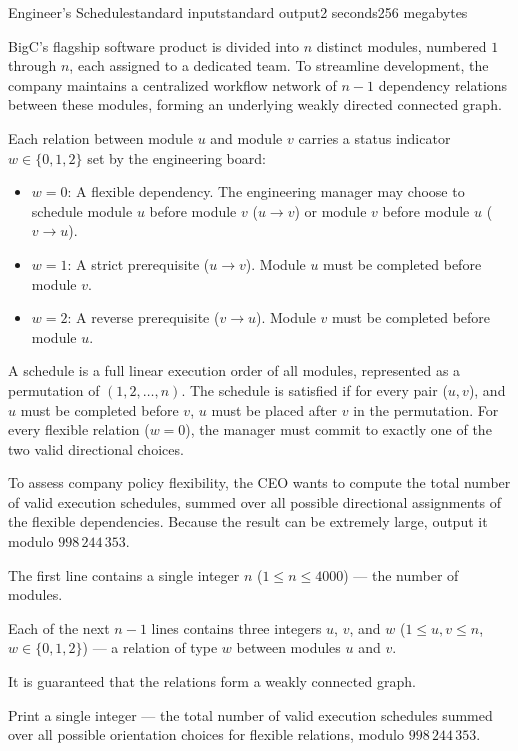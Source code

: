 \begin{problem}{Engineer's Schedule}{standard input}{standard output}{2 seconds}{256 megabytes}

BigC's flagship software product is divided into $n$ distinct modules, numbered $1$ through $n$, each assigned to a dedicated team. 
To streamline development, the company maintains a centralized workflow network of $n - 1$ dependency relations between these modules, forming an underlying weakly directed connected graph.

Each relation between module $u$ and module $v$ carries a status indicator $w \in \{0, 1, 2\}$ set by the engineering board:

\begin{itemize}
  \item $w = 0$: A flexible dependency. The engineering manager may choose to schedule module $u$ before module $v$ ($u \to v$) or module $v$ before module $u$ ($v \to u$).
  \item $w = 1$: A strict prerequisite ($u \to v$). Module $u$ must be completed before module $v$.
  \item $w = 2$: A reverse prerequisite ($v \to u$). Module $v$ must be completed before module $u$.
\end{itemize}

A schedule is a full linear execution order of all modules, represented as a permutation of $(1, 2, \dots, n)$. The schedule is satisfied if for every pair ($u, v$), and $u$ must be completed before $v$, $u$ must be placed after $v$ in the permutation. For every flexible relation ($w = 0$), the manager must commit to exactly one of the two valid directional choices.

To assess company policy flexibility, the CEO wants to compute the total number of valid execution schedules, summed over all possible directional assignments of the flexible dependencies. Because the result can be extremely large, output it modulo $998\,244\,353$.

\InputFile
The first line contains a single integer $n$ ($1 \le n \le 4000$) --- the number of modules.

Each of the next $n - 1$ lines contains three integers $u$, $v$, and $w$ ($1 \le u, v \le n$, $w \in \{0, 1, 2\}$) --- a relation of type $w$ between modules $u$ and $v$.

It is guaranteed that the relations form a weakly connected graph.


\OutputFile
Print a single integer --- the total number of valid execution schedules summed over all possible orientation choices for flexible relations, modulo $998\,244\,353$.


\end{problem}
